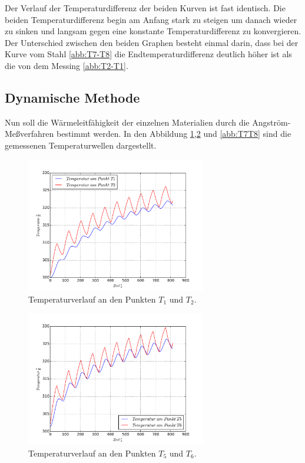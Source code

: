 \FloatBarrier
Der Verlauf der Temperaturdifferenz der beiden Kurven
ist fast identisch. Die beiden Temperaturdifferenz begin am
Anfang stark zu steigen um danach wieder zu sinken
und langsam gegen eine konstante Temperaturdifferenz
zu konvergieren.
Der Unterschied zwischen den beiden Graphen besteht einmal
darin, dass bei der Kurve vom Stahl \ref{abb:T7-T8} die Endtemperaturdifferenz
deutlich höher ist als die von dem Messing \ref{abb:T2-T1}.

\subsection{Dynamische Methode}
Nun soll die Wärmeleitfähigkeit der einzelnen
Materialien durch
die Angström-Meßverfahren bestimmt werden.
In den Abbildung \ref{abb:T1T2},\ref{abb:T5T6} und \ref{abb:T7T8}
sind die gemessenen Temperaturwellen dargestellt.
\begin{figure}
  \centering
  \includegraphics[width=0.7\textwidth]{plotT1T2.pdf}
  \caption{Temperaturverlauf an den Punkten $T_1$ und $T_2$.}
  \label{abb:T1T2}
\end{figure}
\begin{figure}
  \centering
  \includegraphics[width=0.7\textwidth]{plotT5T6.pdf}
  \caption{Temperaturverlauf an den Punkten $T_5$ und $T_6$.}
  \label{abb:T5T6}
\end{figure}
